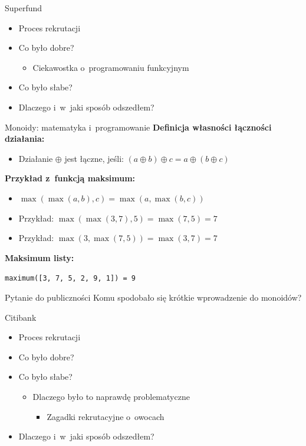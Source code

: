 \documentclass{beamer}
\begin{document}
\begin{frame}{Superfund}
  \begin{itemize}
    \item Proces rekrutacji
    \item Co było dobre?
      \begin{itemize}
        \item Ciekawostka o~programowaniu funkcyjnym
      \end{itemize}
    \item Co było słabe?
    \item Dlaczego i~w~jaki sposób odszedłem?
  \end{itemize}
\end{frame}

\begin{frame}{Monoidy: matematyka i~programowanie}
  \textbf{Definicja własności łączności działania:}
  \begin{itemize}
    \item Działanie $\oplus$ jest łączne, jeśli: $(a \oplus b) \oplus c = a \oplus (b \oplus c)$
  \end{itemize}

  \vspace{0.5cm}
  \textbf{Przykład z~funkcją maksimum:}
  \begin{itemize}
    \item $\max(\max(a, b), c) = \max(a, \max(b, c))$
    \item Przykład: $\max(\max(3, 7), 5) = \max(7, 5) = 7$
    \item Przykład: $\max(3, \max(7, 5)) = \max(3, 7) = 7$
  \end{itemize}

  \vspace{0.5cm}
  \textbf{Maksimum listy:}

  \texttt{maximum([3, 7, 5, 2, 9, 1]) = 9}
\end{frame}

\begin{frame}{Pytanie do publiczności}
  \centering
  \Large
  Komu spodobało się krótkie wprowadzenie do monoidów?
\end{frame}

\begin{frame}{Citibank}
  \begin{itemize}
    \item Proces rekrutacji
    \item Co było dobre?
    \item Co było słabe?
      \begin{itemize}
        \item Dlaczego było to naprawdę problematyczne
          \begin{itemize}
            \item Zagadki rekrutacyjne o~owocach
          \end{itemize}
      \end{itemize}
    \item Dlaczego i~w~jaki sposób odszedłem?
  \end{itemize}
\end{frame}
\end{document}
